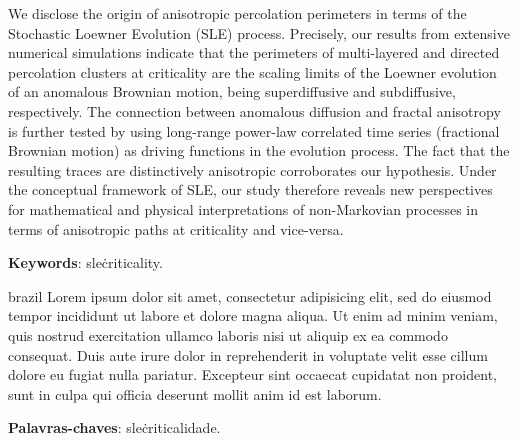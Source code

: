 \setlength{\absparsep}{18pt} %
\begin{resumo}
    We disclose the origin of anisotropic percolation perimeters in terms of
    the Stochastic Loewner Evolution (SLE) process. Precisely, our results from
    extensive numerical simulations indicate that the perimeters of
    multi-layered and directed percolation clusters at criticality are the
    scaling limits of the Loewner evolution of an anomalous Brownian motion,
    being superdiffusive and subdiffusive, respectively. The connection between
    anomalous diffusion and fractal anisotropy is further tested by using
    long-range power-law correlated time series (fractional Brownian motion) as
    driving functions in the evolution process. The fact that the resulting
    traces are distinctively anisotropic corroborates our hypothesis. Under the
    conceptual framework of SLE, our study therefore reveals new perspectives
    for mathematical and physical interpretations of non-Markovian processes in
    terms of anisotropic paths at criticality and vice-versa.
    \vspace{\onelineskip}
    \noindent 

    \textbf{Keywords}: sle\. criticality.
\end{resumo}

\begin{resumo}[Resumo]
\begin{otherlanguage*}{brazil}
    Lorem ipsum dolor sit amet, consectetur adipisicing elit, sed do eiusmod
    tempor incididunt ut labore et dolore magna aliqua. Ut enim ad minim
    veniam, quis nostrud exercitation ullamco laboris nisi ut aliquip ex ea
    commodo consequat. Duis aute irure dolor in reprehenderit in voluptate
    velit esse cillum dolore eu fugiat nulla pariatur. Excepteur sint occaecat
    cupidatat non proident, sunt in culpa qui officia deserunt mollit anim id
    est laborum.
    \vspace{\onelineskip}
    \noindent 

    \textbf{Palavras-chaves}: sle\. criticalidade.
\end{otherlanguage*}
\end{resumo}
